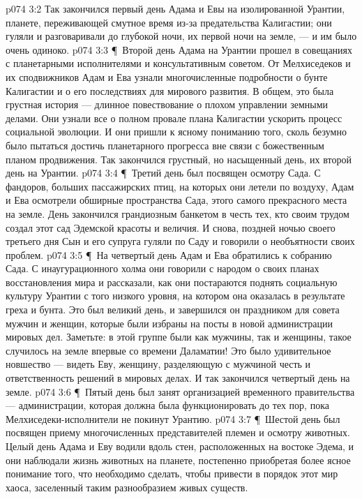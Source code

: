 \vs p074 3:2 Так закончился первый день Адама и Евы на изолированной Урантии, планете, переживающей смутное время из\hyp{}за предательства Калигастии; они гуляли и разговаривали до глубокой ночи, их первой ночи на земле, --- и им было очень одиноко.
\vs p074 3:3 \P\ Второй день Адама на Урантии прошел в совещаниях с планетарными исполнителями и консультативным советом. От Мелхиседеков и их сподвижников Адам и Ева узнали многочисленные подробности о бунте Калигастии и о его последствиях для мирового развития. В общем, это была грустная история --- длинное повествование о плохом управлении земными делами. Они узнали все о полном провале плана Калигастии ускорить процесс социальной эволюции. И они пришли к ясному пониманию того, сколь безумно было пытаться достичь планетарного прогресса вне связи с божественным планом продвижения. Так закончился грустный, но насыщенный день, их второй день на Урантии.
\vs p074 3:4 \P\ Третий день был посвящен осмотру Сада. С фандоров, больших пассажирских птиц, на которых они летели по воздуху, Адам и Ева осмотрели обширные пространства Сада, этого самого прекрасного места на земле. День закончился грандиозным банкетом в честь тех, кто своим трудом создал этот сад Эдемской красоты и величия. И снова, поздней ночью своего третьего дня Сын и его супруга гуляли по Саду и говорили о необъятности своих проблем.
\vs p074 3:5 \P\ На четвертый день Адам и Ева обратились к собранию Сада. С инаугурационного холма они говорили с народом о своих планах восстановления мира и рассказали, как они постараются поднять социальную культуру Урантии с того низкого уровня, на котором она оказалась в результате греха и бунта. Это был великий день, и завершился он праздником для совета мужчин и женщин, которые были избраны на посты в новой администрации мировых дел. Заметьте: в этой группе были как мужчины, так и женщины, такое случилось на земле впервые со времени Даламатии! Это было удивительное новшество --- видеть Еву, женщину, разделяющую с мужчиной честь и ответственность решений в мировых делах. И так закончился четвертый день на земле.
\vs p074 3:6 \P\ Пятый день был занят организацией временного правительства --- администрации, которая должна была функционировать до тех пор, пока Мелхиседеки\hyp{}исполнители не покинут Урантию.
\vs p074 3:7 \P\ Шестой день был посвящен приему многочисленных представителей племен и осмотру животных. Целый день Адама и Еву водили вдоль стен, расположенных на востоке Эдема, и они наблюдали жизнь животных на планете, постепенно приобретая более ясное понимание того, что необходимо сделать, чтобы привести в порядок этот мир хаоса, заселенный таким разнообразием живых существ.
